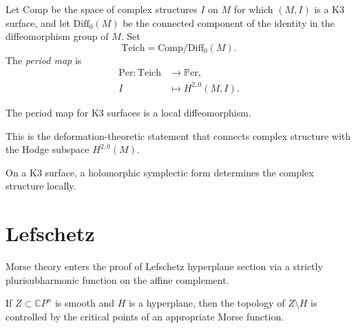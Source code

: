 \begin{definition}[Misha]
\label{definition-period-map-misha}
Let $\mathrm{Comp}$ be the space of complex
structures $I$ on $M$ for which $(M,I)$ is
a K3 surface, and let $\mathrm{Diff}_0(M)$
be the connected component of the identity
in the diffeomorphism group of $M$.
Set
$$
\mathrm{Teich}
=
\mathrm{Comp}/\mathrm{Diff}_0(M).
$$
The \textit{period map} is
$$
\begin{aligned}
\mathrm{Per}:\mathrm{Teich}
&\longrightarrow \mathbb{P}\mathrm{er},\\
I&\longmapsto H^{2,0}(M,I).
\end{aligned}
$$
\end{definition}

\begin{proposition}
The period map for K3 surfaces is
a local diffeomorphism.
\end{proposition}

\begin{remark}
This is the deformation-theoretic
statement that connects complex
structure with the Hodge subspace
$H^{2,0}(M)$.
\end{remark}

\begin{proposition}
On a K3 surface, a holomorphic
symplectic form determines the
complex structure locally.
\end{proposition}

\section{Lefschetz}
\label{section-lefschetz}

\begin{remark}
Morse theory enters the proof of
Lefschetz hyperplane section via
a strictly plurisubharmonic
function on the affine complement.
\end{remark}

\begin{proposition}
If $Z\subset \mathbb{C}P^n$ is
smooth and $H$ is a hyperplane,
then the topology of
$Z\setminus H$ is controlled by
the critical points of an
appropriate Morse function.
\end{proposition}

